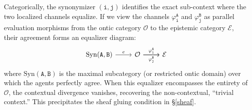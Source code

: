 \documentclass{article}
\numberwithin{tm}{section}
\numberwithin{dn}{section}
\numberwithin{as}{section}
\numberwithin{rk}{section}
\numberwithin{lem}{section}
\numberwithin{ax}{section}
\numberwithin{pp}{section}
\numberwithin{eg}{section}
\numberwithin{war}{section}
\numberwithin{equation}{section}
\numberwithin{prop}{section}
\numberwithin{nt}{section}
\numberwithin{rc}{section}
\def\code#1{\texttt{#1}}
\begin{document}
Categorically, the synonymizer $(\code{i}, \code{j})$ identifies the exact sub-context where the two localized channels equalize. If we view the channels $\varphi_{\code{i}}^\code{A}$ and $\varphi_{\code{j}}^\code{B}$ as parallel evaluation morphisms from the ontic category $\mathcal{O}$ to the epistemic category $\mathcal{E}$, their agreement forms an equalizer diagram:
\begin{equation}
	\begin{tikzcd}
		\mathrm{Syn}(\code{A}, \code{B}) \arrow[r, "e"] & \mathcal{O} \arrow[r, "\varphi_{\code{i}}^\code{A}" shift left=1.5ex] \arrow[r, "\varphi_{\code{j}}^\code{B}"' shift right=1ex] & \mathcal{E}
	\end{tikzcd}
\end{equation}
where $\mathrm{Syn}(\code{A}, \code{B})$ is the maximal subcategory (or restricted ontic domain) over which the agents perfectly agree. When this equalizer encompasses the entirety of $\mathcal{O}$, the contextual divergence vanishes, recovering the non-contextual, ``trivial context.'' This precipitates the sheaf gluing condition in \S\ref{sheaf}.
\end{document}
